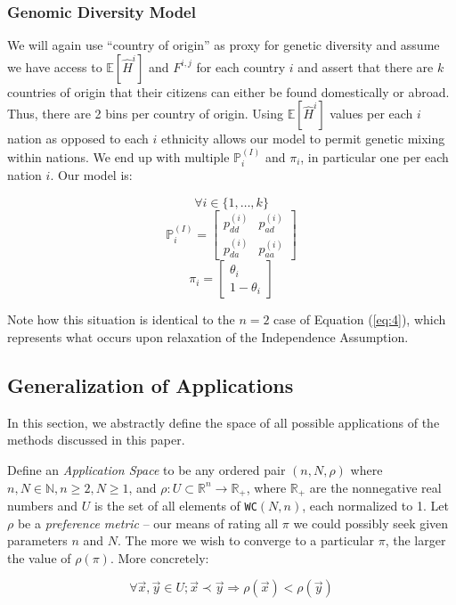 \documentclass{article}
\begin{document}
\subsubsection{Genomic Diversity Model}
We will again use ``country of origin'' as proxy for genetic diversity and assume we have access to $\mathbb{E}[\hat{H}^i]$ and $F^{i,j}$ for each country $i$ and  assert that there are $k$ countries of origin that their citizens can either be found domestically or abroad. Thus, there are 2 bins per country of origin. Using $\mathbb{E}[\hat{H}^i]$ values per each $i$ nation as opposed to each $i$ ethnicity allows our model to permit genetic mixing within nations. We end up with multiple $\mathbb{P}^{(I)}_i$ and $\pi_i$, in particular one per each nation $i$. Our model is:

\[
\forall i \in \{1, \dots, k\}
\]\[
\mathbb{P}^{(I)}_i
= \begin{bmatrix}
    p^{(i)}_{dd} & p^{(i)}_{ad} \\
    p^{(i)}_{da} & p^{(i)}_{aa}
\end{bmatrix}
\]\[
\pi_i
= \begin{bmatrix}
    \theta_i \\
    1 - \theta_i
\end{bmatrix}
\]

Note how this situation is identical to the $n=2$ case of Equation (\ref{eq:4}), which represents what occurs upon relaxation of the Independence Assumption.

\subsection{Generalization of Applications}
In this section, we abstractly define the space of all possible applications of the methods discussed in this paper.

Define an \textit{Application Space} to be any ordered pair $(n,N,\rho)$ where $n,N \in \mathbb{N}, n \geq 2, N \geq 1$, and $\rho : U \subset \mathbb{R}^n \rightarrow \mathbb{R_+}$, where $\mathbb{R_+}$ are the nonnegative real numbers and $U$ is the set of all elements of \texttt{WC}$(N,n)$, each normalized to 1. Let $\rho$ be a \textit{preference metric} -- our means of rating all $\pi$ we could possibly seek given parameters $n$ and $N$. The more we wish to converge to a particular $\pi$, the larger the value of $\rho(\pi)$. More concretely:

\[
\forall \vec{x},\vec{y} \in U;  \vec{x} \prec \vec{y} \Rightarrow \rho(\vec{x}) < \rho(\vec{y})
\]
\end{document}
